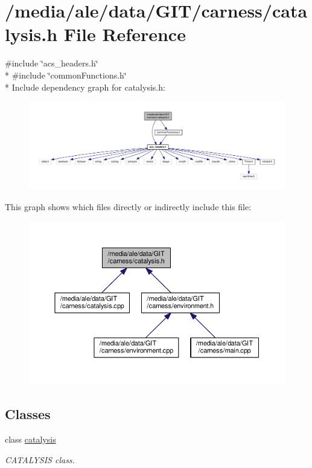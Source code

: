 \hypertarget{a00068}{\section{/media/ale/data/\-G\-I\-T/carness/catalysis.h File Reference}
\label{a00068}
}
{\ttfamily \#include \char`\"{}acs\-\_\-headers.\-h\char`\"{}}\\*
{\ttfamily \#include \char`\"{}common\-Functions.\-h\char`\"{}}\\*
Include dependency graph for catalysis.\-h\-:\nopagebreak
\begin{figure}[H]
\begin{center}
\leavevmode
\includegraphics[width=350pt]{a00134}
\end{center}
\end{figure}
This graph shows which files directly or indirectly include this file\-:\nopagebreak
\begin{figure}[H]
\begin{center}
\leavevmode
\includegraphics[width=350pt]{a00135}
\end{center}
\end{figure}
\subsection*{Classes}
\begin{DoxyCompactItemize}
\item 
class \hyperlink{a00001}{catalysis}
\begin{DoxyCompactList}\small\item\em C\-A\-T\-A\-L\-Y\-S\-I\-S class. \end{DoxyCompactList}\end{DoxyCompactItemize}
